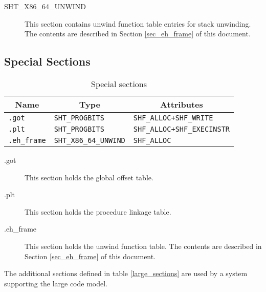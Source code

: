 \begin{description}
 \item[SHT_X86_64_UNWIND]
        This section contains unwind function table entries for
        stack unwinding.  The contents are described in
        Section \ref{sec_eh_frame} of this document.
\end{description}

\subsection{Special Sections}

\begin{table}[H]
\Hrule
  \caption{Special sections}
  \begin{center}
    \begin{tabular}[t]{l|l|l}
      \multicolumn{1}{c}{Name} & \multicolumn{1}{c}{Type}
       & \multicolumn{1}{c}{Attributes} \\
      \hline
      \texttt{.got} & \texttt{SHT_PROGBITS} & \texttt{SHF_ALLOC+SHF_WRITE} \\
      \texttt{.plt}&\texttt{SHT_PROGBITS} & \texttt{SHF_ALLOC+SHF_EXECINSTR} \\
      \texttt{.eh_frame} & \texttt{SHT_X86_64_UNWIND} & \texttt{SHF_ALLOC}
    \end{tabular}
  \end{center}
\Hrule
\end{table}

\begin{description}
 \item[.got] This section holds the global offset table.
 \item[.plt] This section holds the procedure linkage table.
 \item[.eh_frame] This section holds the unwind function table.
                      The contents are described in Section \ref{sec_eh_frame}
                      of this document.
\end{description}

The additional sections defined in table \ref{large_sections} are used
by a system supporting the large code model.

